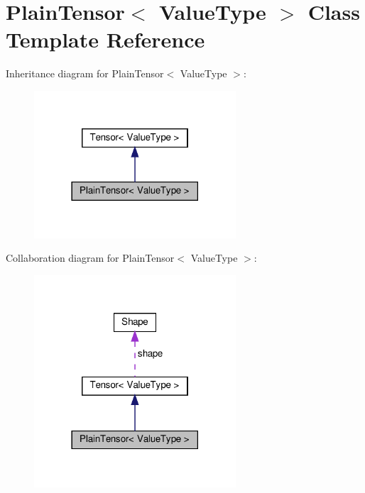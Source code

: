\hypertarget{classPlainTensor}{}\section{Plain\+Tensor$<$ Value\+Type $>$ Class Template Reference}
\label{classPlainTensor}


Inheritance diagram for Plain\+Tensor$<$ Value\+Type $>$\+:
\nopagebreak
\begin{figure}[H]
\begin{center}
\leavevmode
\includegraphics[width=213pt]{classPlainTensor__inherit__graph}
\end{center}
\end{figure}


Collaboration diagram for Plain\+Tensor$<$ Value\+Type $>$\+:
\nopagebreak
\begin{figure}[H]
\begin{center}
\leavevmode
\includegraphics[width=213pt]{classPlainTensor__coll__graph}
\end{center}
\end{figure}

